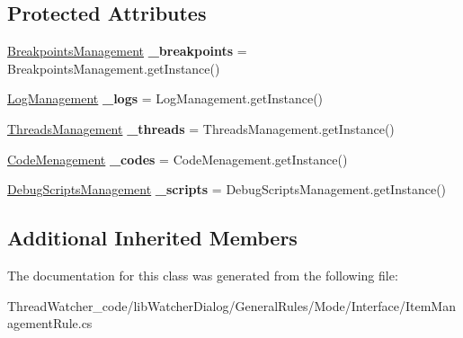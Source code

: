 \subsection*{Protected Attributes}
\begin{DoxyCompactItemize}
\item 
\hypertarget{classlib_watcher_dialog_1_1_general_rules_1_1_mode_1_1_item_management_rule_a19d20905675a9517b5c0d71e3d896b0d}{\hyperlink{classlib_watcher_dialog_1_1_property_item_1_1_break_point_1_1_breakpoints_management}{Breakpoints\+Management} {\bfseries \+\_\+breakpoints} = Breakpoints\+Management.\+get\+Instance()}\label{classlib_watcher_dialog_1_1_general_rules_1_1_mode_1_1_item_management_rule_a19d20905675a9517b5c0d71e3d896b0d}

\item 
\hypertarget{classlib_watcher_dialog_1_1_general_rules_1_1_mode_1_1_item_management_rule_acc374930e39f067b392204133ec482cf}{\hyperlink{classlib_watcher_dialog_1_1_property_item_1_1_log_1_1_log_management}{Log\+Management} {\bfseries \+\_\+logs} = Log\+Management.\+get\+Instance()}\label{classlib_watcher_dialog_1_1_general_rules_1_1_mode_1_1_item_management_rule_acc374930e39f067b392204133ec482cf}

\item 
\hypertarget{classlib_watcher_dialog_1_1_general_rules_1_1_mode_1_1_item_management_rule_a62380bfae881e46a064ae55c886a6477}{\hyperlink{classlib_watcher_dialog_1_1_property_item_1_1_thread_1_1_threads_management}{Threads\+Management} {\bfseries \+\_\+threads} = Threads\+Management.\+get\+Instance()}\label{classlib_watcher_dialog_1_1_general_rules_1_1_mode_1_1_item_management_rule_a62380bfae881e46a064ae55c886a6477}

\item 
\hypertarget{classlib_watcher_dialog_1_1_general_rules_1_1_mode_1_1_item_management_rule_ad17961fc13fa5db771a4773aec571c1c}{\hyperlink{classlib_watcher_dialog_1_1_property_item_1_1_code_1_1_code_menagement}{Code\+Menagement} {\bfseries \+\_\+codes} = Code\+Menagement.\+get\+Instance()}\label{classlib_watcher_dialog_1_1_general_rules_1_1_mode_1_1_item_management_rule_ad17961fc13fa5db771a4773aec571c1c}

\item 
\hypertarget{classlib_watcher_dialog_1_1_general_rules_1_1_mode_1_1_item_management_rule_ad38599a4614178e958b13e8a149ca41c}{\hyperlink{classlib_watcher_dialog_1_1_property_item_1_1_debug_script_1_1_debug_scripts_management}{Debug\+Scripts\+Management} {\bfseries \+\_\+scripts} = Debug\+Scripts\+Management.\+get\+Instance()}\label{classlib_watcher_dialog_1_1_general_rules_1_1_mode_1_1_item_management_rule_ad38599a4614178e958b13e8a149ca41c}

\end{DoxyCompactItemize}
\subsection*{Additional Inherited Members}


The documentation for this class was generated from the following file\+:\begin{DoxyCompactItemize}
\item 
Thread\+Watcher\+\_\+code/lib\+Watcher\+Dialog/\+General\+Rules/\+Mode/\+Interface/Item\+Management\+Rule.\+cs\end{DoxyCompactItemize}

